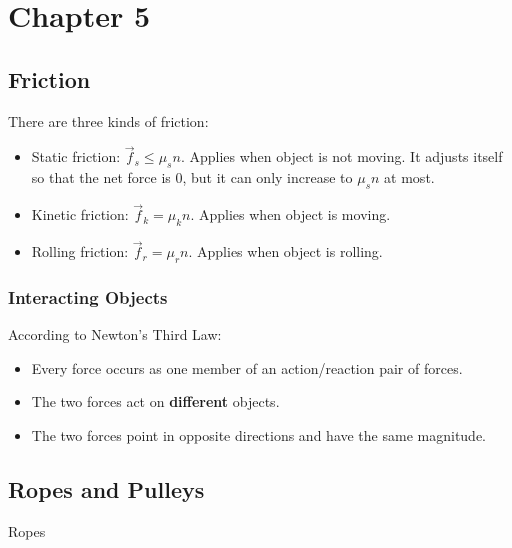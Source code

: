 \section{Chapter 5}

\subsection{Friction}

There are three kinds of friction:

\begin{itemize}
    \item Static friction: $\Vec{f}_s \leq \mu_s n$. Applies when object is not moving. It adjusts itself so that the net force is 0, but it can only increase to $\mu_s n$ at most.
    \item Kinetic friction: $\Vec{f}_k = \mu_k n$. Applies when object is moving.
    \item Rolling friction: $\Vec{f}_r = \mu_r n$. Applies when object is rolling.
\end{itemize}

\subsubsection{Interacting Objects}

According to Newton's Third Law:

\begin{itemize}
    \item Every force occurs as one member of an action/reaction pair of forces.
    \item The two forces act on \textbf{different} objects.
    \item The two forces point in opposite directions and have the same magnitude.
\end{itemize}

\subsection{Ropes and Pulleys}

Ropes

